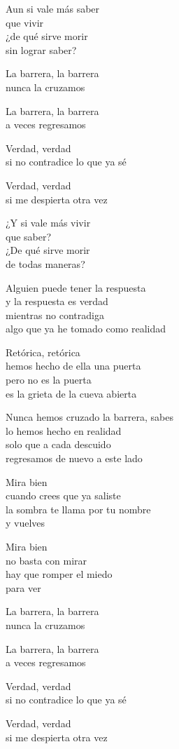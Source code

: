 \begin{lyrics}
Aun si vale más saber\\
que vivir\\
¿de qué sirve morir\\
sin lograr saber?

La barrera, la barrera\\
nunca la cruzamos

La barrera, la barrera\\
a veces regresamos

Verdad, verdad\\
si no contradice lo que ya sé

Verdad, verdad\\
si me despierta otra vez

¿Y si vale más vivir\\
que saber?\\
¿De qué sirve morir\\
de todas maneras?

Alguien puede tener la respuesta\\
y la respuesta es verdad\\
mientras no contradiga\\
algo que ya he tomado como realidad

Retórica, retórica\\
hemos hecho de ella una puerta\\
pero no es la puerta\\
es la grieta de la cueva abierta

Nunca hemos cruzado la barrera, sabes\\
lo hemos hecho en realidad\\
solo que a cada descuido\\
regresamos de nuevo a este lado

Mira bien\\
cuando crees que ya saliste\\
la sombra te llama por tu nombre\\
y vuelves

Mira bien\\
no basta con mirar\\
hay que romper el miedo\\
para ver

La barrera, la barrera\\
nunca la cruzamos

La barrera, la barrera\\
a veces regresamos

Verdad, verdad\\
si no contradice lo que ya sé

Verdad, verdad\\
si me despierta otra vez
\end{lyrics}

